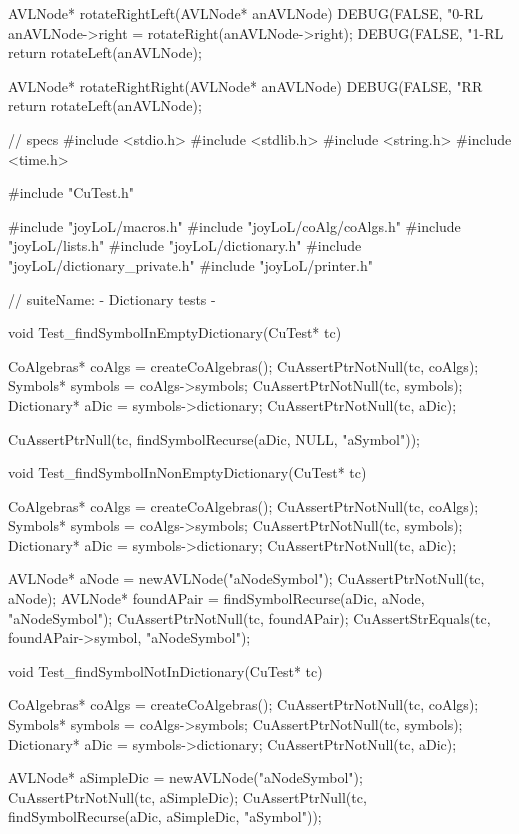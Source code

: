 AVLNode* rotateRightLeft(AVLNode* anAVLNode) {
  DEBUG(FALSE, "0-RL %
  anAVLNode->right = rotateRight(anAVLNode->right);
  DEBUG(FALSE, "1-RL %
  return rotateLeft(anAVLNode);
}

AVLNode* rotateRightRight(AVLNode* anAVLNode) {
  DEBUG(FALSE, "RR %
  return rotateLeft(anAVLNode);
}

\stoptyping

\starttyping
// specs
#include <stdio.h>
#include <stdlib.h>
#include <string.h>
#include <time.h>

#include "CuTest.h"

#include "joyLoL/macros.h"
#include "joyLoL/coAlg/coAlgs.h"
#include "joyLoL/lists.h"
#include "joyLoL/dictionary.h"
#include "joyLoL/dictionary_private.h"
#include "joyLoL/printer.h"

// suiteName: - Dictionary tests -

void Test_findSymbolInEmptyDictionary(CuTest* tc) {
  CoAlgebras* coAlgs = createCoAlgebras();
  CuAssertPtrNotNull(tc, coAlgs);
  Symbols* symbols = coAlgs->symbols;
  CuAssertPtrNotNull(tc, symbols);
  Dictionary* aDic = symbols->dictionary;
  CuAssertPtrNotNull(tc, aDic);

  CuAssertPtrNull(tc, findSymbolRecurse(aDic, NULL, "aSymbol"));
}

void Test_findSymbolInNonEmptyDictionary(CuTest* tc) {
  CoAlgebras* coAlgs = createCoAlgebras();
  CuAssertPtrNotNull(tc, coAlgs);
  Symbols* symbols = coAlgs->symbols;
  CuAssertPtrNotNull(tc, symbols);
  Dictionary* aDic = symbols->dictionary;
  CuAssertPtrNotNull(tc, aDic);

  AVLNode* aNode = newAVLNode("aNodeSymbol");
  CuAssertPtrNotNull(tc, aNode);
  AVLNode* foundAPair = findSymbolRecurse(aDic, aNode, "aNodeSymbol");
  CuAssertPtrNotNull(tc, foundAPair);
  CuAssertStrEquals(tc, foundAPair->symbol, "aNodeSymbol");
}

void Test_findSymbolNotInDictionary(CuTest* tc) {
  CoAlgebras* coAlgs = createCoAlgebras();
  CuAssertPtrNotNull(tc, coAlgs);
  Symbols* symbols = coAlgs->symbols;
  CuAssertPtrNotNull(tc, symbols);
  Dictionary* aDic = symbols->dictionary;
  CuAssertPtrNotNull(tc, aDic);

  AVLNode* aSimpleDic = newAVLNode("aNodeSymbol");
  CuAssertPtrNotNull(tc, aSimpleDic);
  CuAssertPtrNull(tc, findSymbolRecurse(aDic, aSimpleDic, "aSymbol"));
}

